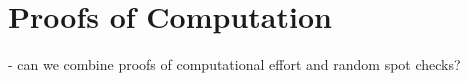 \section{Proofs of Computation} \label{sect:poc}

- can we combine proofs of computational effort and random spot checks?